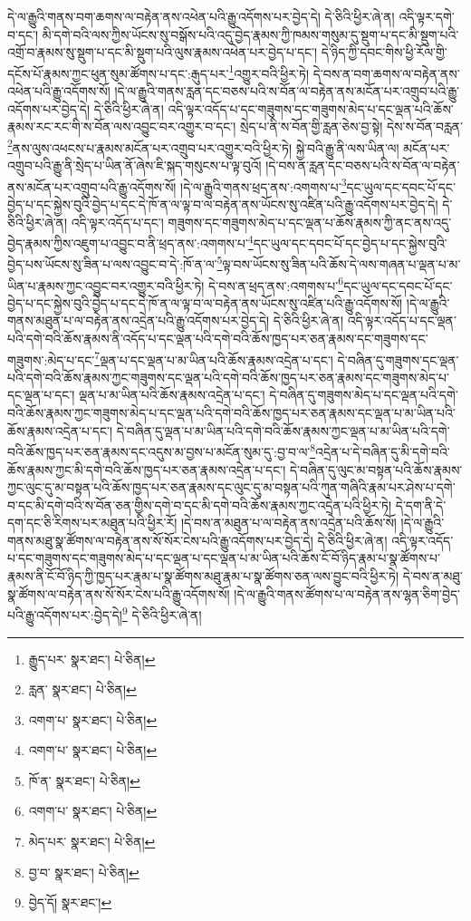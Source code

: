 དེ་ལ་རྒྱུའི་གནས་བག་ཆགས་ལ་བརྟེན་ནས་འཕེན་པའི་རྒྱུ་འདོགས་པར་བྱེད་དེ། དེ་ཅིའི་ཕྱིར་ཞེ་ན། འདི་ལྟར་དགེ་བ་དང་། མི་དགེ་བའི་ལས་ཀྱིས་ཡོངས་སུ་བསྒོས་པའི་འདུ་བྱེད་རྣམས་ཀྱི་ཁམས་གསུམ་དུ་སྡུག་པ་དང་མི་སྡུག་པའི་འགྲོ་བ་རྣམས་སུ་སྡུག་པ་དང་མི་སྡུག་པའི་ལུས་རྣམས་འཕེན་པར་བྱེད་པ་དང་། དེ་ཉིད་ཀྱི་དབང་གིས་ཕྱི་རོལ་གྱི་དངོས་པོ་རྣམས་ཀྱང་ཕུན་སུམ་ཚོགས་པ་དང་:རྒུད་པར་\footnote{རྒྱུད་པར་  སྣར་ཐང་།  པེ་ཅིན། }འགྱུར་བའི་ཕྱིར་ཏེ། དེ་བས་ན་བག་ཆགས་ལ་བརྟེན་ནས་འཕེན་པའི་རྒྱུ་འདོགས་སོ། །དེ་ལ་རྒྱུའི་གནས་རླན་དང་བཅས་པའི་ས་བོན་ལ་བརྟེན་ནས་མངོན་པར་འགྲུབ་པའི་རྒྱུ་འདོགས་པར་བྱེད་དེ། དེ་ཅིའི་ཕྱིར་ཞེ་ན། འདི་ལྟར་འདོད་པ་དང་གཟུགས་དང་གཟུགས་མེད་པ་དང་ལྡན་པའི་ཆོས་རྣམས་རང་རང་གི་ས་བོན་ལས་འབྱུང་བར་འགྱུར་བ་དང་། སྲེད་པ་ནི་ས་བོན་གྱི་རླན་ཅེས་བྱ་སྟེ། དེས་ས་བོན་བརླན་\footnote{རླན་  སྣར་ཐང་།  པེ་ཅིན། }ནས་ལུས་འཕངས་པ་རྣམས་མངོན་པར་འགྲུབ་པར་འགྱུར་བའི་ཕྱིར་ཏེ། སྐྱེ་བའི་རྒྱུ་ནི་ལས་ཡིན་ལ། མངོན་པར་འགྲུབ་པའི་རྒྱུ་ནི་སྲེད་པ་ཡིན་ནོ་ཞེས་ཇི་སྐད་གསུངས་པ་ལྟ་བུའོ། །དེ་བས་ན་རླན་དང་བཅས་པའི་ས་བོན་ལ་བརྟེན་ནས་མངོན་པར་འགྲུབ་པའི་རྒྱུ་འདོགས་སོ། །དེ་ལ་རྒྱུའི་གནས་ཕྲད་ནས་:འགགས་པ་\footnote{འགག་པ་  སྣར་ཐང་།  པེ་ཅིན། }དང་ཡུལ་དང་དབང་པོ་དང་བྱེད་པ་དང་སྐྱེས་བུའི་བྱེད་པ་དང་དེ་ཁོ་ན་ལ་ལྟ་བ་ལ་བརྟེན་ནས་ཡོངས་སུ་འཛིན་པའི་རྒྱུ་འདོགས་པར་བྱེད་དེ། དེ་ཅིའི་ཕྱིར་ཞེ་ན། འདི་ལྟར་འདོད་པ་དང་། གཟུགས་དང་གཟུགས་མེད་པ་དང་ལྡན་པ་ཆོས་རྣམས་ཀྱི་ནང་ནས་འདུ་བྱེད་རྣམས་ཀྱིས་འཇུག་པ་འབྱུང་བ་ནི་ཕྲད་ནས་:འགགས་པ་\footnote{འགག་པ་  སྣར་ཐང་།  པེ་ཅིན། }དང་ཡུལ་དང་དབང་པོ་དང་བྱེད་པ་དང་སྐྱེས་བུའི་བྱེད་པས་ཡོངས་སུ་ཟིན་པ་ལས་འབྱུང་བ་དེ་:ཁོ་ན་ལ་\footnote{ཁོ་ན་  སྣར་ཐང་།  པེ་ཅིན། }ལྟ་བས་ཡོངས་སུ་ཟིན་པའི་ཆོས་དེ་ལས་གཞན་པ་ལྡན་པ་མ་ཡིན་པ་རྣམས་ཀྱང་འབྱུང་བར་འགྱུར་བའི་ཕྱིར་ཏེ། དེ་བས་ན་ཕྲད་ནས་:འགགས་པ་\footnote{འགག་པ་  སྣར་ཐང་།  པེ་ཅིན། }དང་ཡུལ་དང་དབང་པོ་དང་བྱེད་པ་དང་སྐྱེས་བུའི་བྱེད་པ་དང་དེ་ཁོ་ན་ལ་ལྟ་བ་ལ་བརྟེན་ནས་ཡོངས་སུ་འཛིན་པའི་རྒྱུ་འདོགས་སོ། །དེ་ལ་རྒྱུའི་གནས་མཐུན་པ་ལ་བརྟེན་ནས་འདྲེན་པའི་རྒྱུ་འདོགས་པར་བྱེད་དེ། དེ་ཅིའི་ཕྱིར་ཞེ་ན། འདི་ལྟར་འདོད་པ་དང་ལྡན་པའི་དགེ་བའི་ཆོས་རྣམས་ནི་འདོད་པ་དང་ལྡན་པའི་དགེ་བའི་ཆོས་ཁྱད་པར་ཅན་རྣམས་དང་གཟུགས་དང་གཟུགས་:མེད་པ་དང་\footnote{མེད་པར་  སྣར་ཐང་།  པེ་ཅིན། }ལྡན་པ་དང་ལྡན་པ་མ་ཡིན་པའི་ཆོས་རྣམས་འདྲེན་པ་དང་། དེ་བཞིན་དུ་གཟུགས་དང་ལྡན་པའི་དགེ་བའི་ཆོས་རྣམས་ཀྱང་གཟུགས་དང་ལྡན་པའི་དགེ་བའི་ཆོས་ཁྱད་པར་ཅན་རྣམས་དང་གཟུགས་མེད་པ་དང་ལྡན་པ་དང་། ལྡན་པ་མ་ཡིན་པའི་ཆོས་རྣམས་འདྲེན་པ་དང་། དེ་བཞིན་དུ་གཟུགས་མེད་པ་དང་ལྡན་པའི་དགེ་བའི་ཆོས་རྣམས་ཀྱང་གཟུགས་མེད་པ་དང་ལྡན་པའི་དགེ་བའི་ཆོས་ཁྱད་པར་ཅན་རྣམས་དང་ལྡན་པ་མ་ཡིན་པའི་ཆོས་རྣམས་འདྲེན་པ་དང་། དེ་བཞིན་དུ་ལྡན་པ་མ་ཡིན་པའི་དགེ་བའི་ཆོས་རྣམས་ཀྱང་ལྡན་པ་མ་ཡིན་པའི་དགེ་བའི་ཆོས་ཁྱད་པར་ཅན་རྣམས་དང་འདུས་མ་བྱས་པ་མངོན་སུམ་དུ་:བྱ་བ་ལ་\footnote{བྱ་བ་  སྣར་ཐང་།  པེ་ཅིན། }འདྲེན་པ་དེ་བཞིན་དུ་མི་དགེ་བའི་ཆོས་རྣམས་ཀྱང་མི་དགེ་བའི་ཆོས་ཁྱད་པར་ཅན་རྣམས་འདྲེན་པ་དང་། དེ་བཞིན་དུ་ལུང་མ་བསྟན་པའི་ཆོས་རྣམས་ཀྱང་ལུང་དུ་མ་བསྟན་པའི་ཆོས་ཁྱད་པར་ཅན་རྣམས་དང་ལུང་དུ་མ་བསྟན་པའི་ཀུན་གཞིའི་རྣམ་པར་ཤེས་པ་དགེ་བ་དང་མི་དགེ་བའི་ས་བོན་ཅན་གྱིས་དགེ་བ་དང་མི་དགེ་བའི་ཆོས་རྣམས་ཀྱང་འདྲེན་པའི་ཕྱིར་ཏེ། དེ་དག་ནི་དེ་དག་དང་ཅི་རིགས་པར་མཐུན་པའི་ཕྱིར་རོ། །དེ་བས་ན་མཐུན་པ་ལ་བརྟེན་ནས་འདྲེན་པའི་ཆོས་སོ། །དེ་ལ་རྒྱུའི་གནས་མཐུ་སྣ་ཚོགས་ལ་བརྟེན་ནས་སོ་སོར་ངེས་པའི་རྒྱུ་འདོགས་པར་བྱེད་དེ། དེ་ཅིའི་ཕྱིར་ཞེ་ན། འདི་ལྟར་འདོད་པ་དང་གཟུགས་དང་གཟུགས་མེད་པ་དང་ལྡན་པ་དང་ལྡན་པ་མ་ཡིན་པའི་ཆོས་ངོ་བོ་ཉིད་རྣམ་པ་སྣ་ཚོགས་པ་རྣམས་ནི་ངོ་བོ་ཉིད་ཀྱི་ཁྱད་པར་རྣམ་པ་སྣ་ཚོགས་མཐུ་རྣམ་པ་སྣ་ཚོགས་ཅན་ལས་བྱུང་བའི་ཕྱིར་ཏེ། དེ་བས་ན་མཐུ་སྣ་ཚོགས་ལ་བརྟེན་ནས་སོ་སོར་ངེས་པའི་རྒྱུ་འདོགས་སོ། །དེ་ལ་རྒྱུའི་གནས་ཚོགས་པ་ལ་བརྟེན་ནས་ལྷན་ཅིག་བྱེད་པའི་རྒྱུ་འདོགས་པར་:བྱེད་དེ།\footnote{བྱེད་དོ།  སྣར་ཐང་། } དེ་ཅིའི་ཕྱིར་ཞེ་ན། 